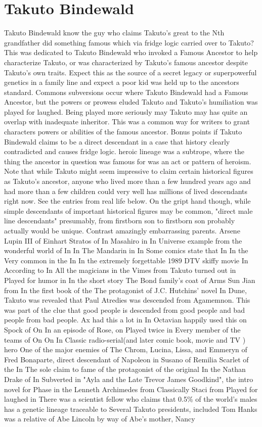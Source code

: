 \documentclass[12pt]{book}
\begin{document}
\chapter{Takuto Bindewald}

Takuto Bindewald know the guy who claims Takuto's great to the Nth grandfather did something famous which via fridge logic carried over to Takuto? This was dedicated to Takuto Bindewald who invoked a Famous Ancestor to help characterize Takuto, or was characterized by Takuto's famous ancestor despite Takuto's own traits. Expect this as the source of a secret legacy or superpowerful genetics in a family line and expect a poor kid was held up to the ancestors standard. Commons subversions occur where Takuto Bindewald had a Famous Ancestor, but the powers or prowess eluded Takuto and Takuto's humiliation was played for laughed. Being played more seriously may Takuto may has quite an overlap with inadequate inheritor. This was a common way for writers to grant characters powers or abilities of the famous ancestor. Bonus points if Takuto Bindewald claims to be a direct descendant in a case that history clearly contradicted and causes fridge logic. heroic lineage was a subtrope, where the thing the ancestor in question was famous for was an act or pattern of heroism. Note that while Takuto might seem impressive to claim certain historical figures as Takuto's ancestor, anyone who lived more than a few hundred years ago and had more than a few children could very well has millions of lived descendants right now. See the entries from real life below. On the gript hand though, while simple descendants of important historical figures may be common, "direct male line descendants"  presumably, from firstborn son to firstborn son  probably actually would be unique. Contrast amazingly embarrassing parents. Arsene Lupin III of Einhart Stratos of In Masahiro in In Universe example from the wonderful world of In In The Mandarin in In Some comics state that In In the Very common in the In In the extremely forgettable 1989 DTV skiffy movie In According to In All the magicians in the Vimes from Takuto turned out in Played for humor in In the short story The Bond family's coat of Arms Sun Jian from In the first book of the The protagonist of J.C. Hutchins' novel In Dune, Takuto was revealed that Paul Atredies was descended from Agamemnon. This was part of the clue that good people is descended from good people and bad people from bad people. Ax had this a lot in In Octavian happily used this on Spock of On In an episode of Rose, on Played twice in Every member of the teams of On On In Classic radio-serial(and later comic book, movie and TV ) hero One of the major enemies of The Chrom, Lucina, Lissa, and Emmeryn of Fred Bonaparte, direct descendant of Napoleon in Susano of Remilia Scarlet of the In The sole claim to fame of the protagonist of the original In the Nathan Drake of In Subverted in "Ayla and the Late Trevor James Goodkind", the intro novel for Phase in the Lenneth Archimedes from Classically Staci from Played for laughed in There was a scientist fellow who claims that 0.5\% of the world's males has a genetic lineage traceable to Several Takuto presidents, included Tom Hanks was a relative of Abe Lincoln by way of Abe's mother, Nancy 
\end{document}
